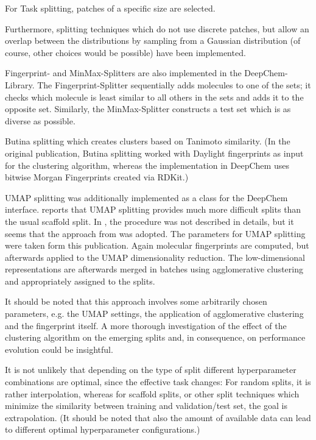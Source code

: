 For Task splitting, patches of a specific size are selected.

Furthermore, splitting techniques which do not use discrete patches, but allow an overlap between the distributions by sampling from a Gaussian distribution (of course, other choices would be possible) have been implemented.

Fingerprint- and MinMax-Splitters are also implemented in the DeepChem-Library. The Fingerprint-Splitter sequentially adds molecules to one of the sets; it checks which molecule is least similar to all others in the sets and adds it to the opposite set. Similarly, the MinMax-Splitter constructs a test set which is as diverse as possible. 

Butina splitting which creates clusters based on Tanimoto similarity. \cite{Butina.1999}
(In the original publication, Butina splitting worked with Daylight fingerprints as input for the clustering algorithm, whereas the implementation in DeepChem uses bitwise Morgan Fingerprints created via RDKit.)

UMAP splitting was additionally implemented as a class for the DeepChem interface.
\cite{Guo.2024} reports that UMAP splitting provides much more difficult splits than the usual scaffold split. In \cite{Guo.2024}, the procedure was not described in details, but it seems that the approach from \cite{HernandezHernandez.2023} was adopted. The parameters for UMAP splitting were taken form this publication.
Again molecular fingerprints are computed, but afterwards applied to the UMAP dimensionality reduction. The low-dimensional representations are afterwards merged in batches using agglomerative clustering and appropriately assigned to the splits.

It should be noted that this approach involves some arbitrarily chosen parameters, e.g. the UMAP settings, the application of agglomerative clustering and the fingerprint itself.
A more thorough investigation of the effect of the clustering algorithm on the emerging splits and, in consequence, on performance evolution could be insightful.

It is not unlikely that depending on the type of split different hyperparameter combinations are optimal, since the effective task changes: For random splits, it is rather interpolation, whereas for scaffold splits, or other split techniques which minimize the similarity between training and validation/test set, the goal is extrapolation.
(It should be noted that also the amount of available data can lead to different optimal hyperparameter configurations.)


